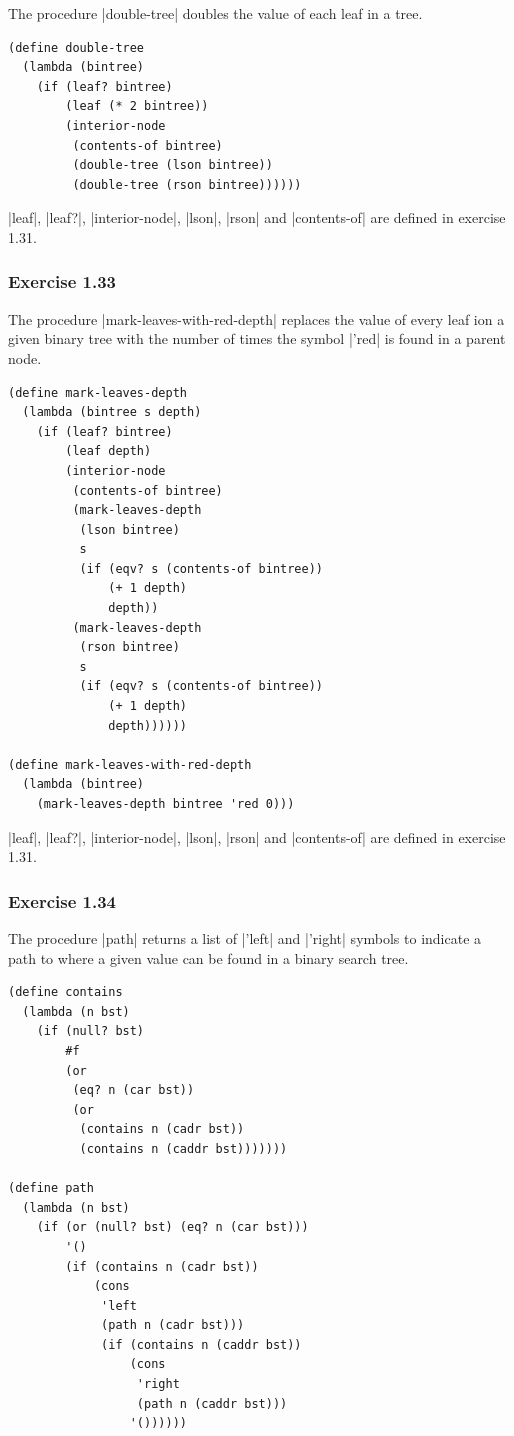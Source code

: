 \documentclass[a4paper]{article}
\begin{document}
The procedure |double-tree| doubles the value of each leaf in a tree.

\begin{lstlisting}
(define double-tree
  (lambda (bintree)
    (if (leaf? bintree)
        (leaf (* 2 bintree))
        (interior-node
         (contents-of bintree)
         (double-tree (lson bintree))
         (double-tree (rson bintree))))))
\end{lstlisting}

|leaf|, |leaf?|, |interior-node|, |lson|, |rson| and |contents-of| are defined in exercise 1.31.

\subsubsection{Exercise 1.33}

The procedure |mark-leaves-with-red-depth| replaces the value of every leaf ion a given binary tree with the number of times the symbol |'red| is found in a parent node.

\begin{lstlisting}
(define mark-leaves-depth
  (lambda (bintree s depth)
    (if (leaf? bintree)
        (leaf depth)
        (interior-node
         (contents-of bintree)
         (mark-leaves-depth
          (lson bintree)
          s
          (if (eqv? s (contents-of bintree))
              (+ 1 depth)
              depth))
         (mark-leaves-depth
          (rson bintree)
          s
          (if (eqv? s (contents-of bintree))
              (+ 1 depth)
              depth))))))

(define mark-leaves-with-red-depth
  (lambda (bintree)
    (mark-leaves-depth bintree 'red 0)))
\end{lstlisting}

|leaf|, |leaf?|, |interior-node|, |lson|, |rson| and |contents-of| are defined in exercise 1.31.

\subsubsection{Exercise 1.34}

The procedure |path| returns a list of |'left| and |'right| symbols to indicate a path to where a given value can be found in a binary search tree.

\begin{lstlisting}
(define contains
  (lambda (n bst)
    (if (null? bst)
        #f
        (or
         (eq? n (car bst))
         (or
          (contains n (cadr bst))
          (contains n (caddr bst)))))))

(define path
  (lambda (n bst)
    (if (or (null? bst) (eq? n (car bst)))
        '()
        (if (contains n (cadr bst))
            (cons
             'left
             (path n (cadr bst)))
             (if (contains n (caddr bst))
                 (cons
                  'right
                  (path n (caddr bst)))
                 '())))))
\end{lstlisting}
\end{document}
